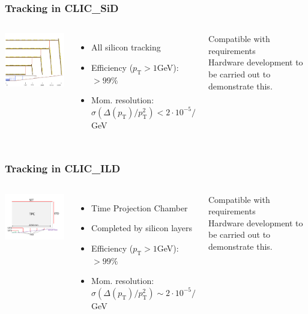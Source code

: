 \documentclass{beamer}
\begin{document}
\begin{frame}
\frametitle{Tracking in CLIC\_SiD}
\begin{columns}[c]
\column{6cm}
\begin{center}
\includegraphics[width=6cm]{sid_tracker_zx.pdf}
\end{center}
\column{6cm}
\begin{itemize}
  \item All silicon tracking
  \item Efficiency ($p_{\textrm{T}}>1$GeV): $>99\%$
  \item Mom. resolution: $\sigma(\Delta(p_{\textrm{T}})/p_{\textrm{T}}^2)<
  2\cdot10^{-5}/$GeV
\end{itemize}
\alert{Compatible with requirements}\\
Hardware development to be carried out to demonstrate this.
\end{columns}
\end{frame}
\begin{frame}
\frametitle{Tracking in CLIC\_ILD}
\begin{columns}[c]
\column{6cm}
\begin{center}
\includegraphics[width=6cm]{CLIC_ILD_tracking_geom.pdf}
\end{center}
\column{6cm}
\begin{itemize}
  \item Time Projection Chamber
  \item Completed by silicon layers
  \item Efficiency ($p_{\textrm{T}}>1$GeV): $>99\%$
  \item Mom. resolution: $\sigma(\Delta(p_{\textrm{T}})/p_{\textrm{T}}^2)\sim 2\cdot10^{-5}/$GeV
\end{itemize}
\alert{Compatible with requirements}\\
Hardware development to be carried out to demonstrate this.
\end{columns}
\end{frame}
\end{document}
